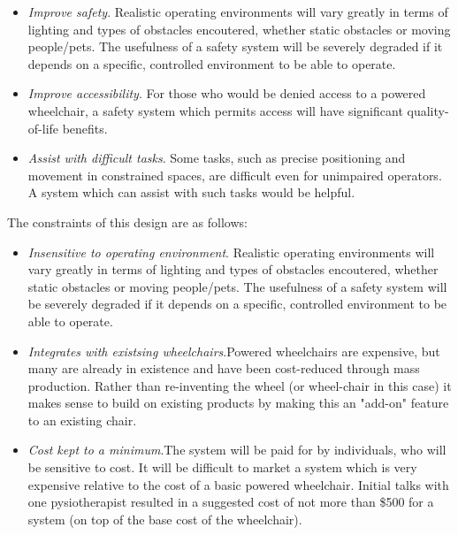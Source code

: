 \documentclass[oneside,final,a4paper]{report}
\begin{document}
\begin{itemize}
 \item \emph{Improve safety}.  Realistic operating environments will vary greatly in terms of lighting and types of obstacles encoutered, whether static obstacles or moving people/pets. The usefulness of a safety system will be severely degraded if it depends on a specific, controlled environment to be able to operate.
 \item \emph{Improve accessibility}.  For those who would be denied access to a powered wheelchair, a safety system which permits access will have significant quality-of-life benefits.
 \item \emph{Assist with difficult tasks}. Some tasks, such as precise positioning and movement in constrained spaces, are difficult even for unimpaired operators.   A system which can assist with such tasks would be helpful.
\end{itemize}

The constraints of this design are as follows:

\begin{itemize}
 \item \emph{Insensitive to operating environment}.  Realistic operating environments will vary greatly in terms of lighting and types of obstacles encoutered, whether static obstacles or moving people/pets. The usefulness of a safety system will be severely degraded if it depends on a specific, controlled environment to be able to operate.
 \item \emph{Integrates with existsing wheelchairs}.Powered wheelchairs are expensive, but many are already in existence and have been cost-reduced through mass production. Rather than re-inventing the wheel (or wheel-chair in this case) it makes sense to build on existing products by making this an "add-on" feature to an existing chair.

 \item \emph{Cost kept to a minimum}.The system will be paid for by individuals, who will be sensitive to cost. It will be difficult to market a system which is very expensive relative to the cost of a basic powered wheelchair. Initial talks with one pysiotherapist resulted in a suggested cost of not more than \$500 for a system (on top of the base cost of the wheelchair).
\end{itemize}
\end{document}
